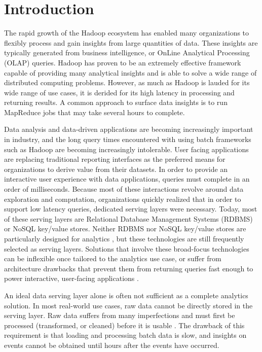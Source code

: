\documentclass{vldb}
\begin{document}
\section{Introduction}
The rapid growth of the Hadoop\cite{shvachko2010hadoop} ecosystem has enabled
many organizations to flexibly process and gain insights from large quantities
of data. These insights are typically generated from business intelligence, or
OnLine Analytical Processing (OLAP) queries. Hadoop has proven to be an
extremely effective framework capable of providing many analytical insights and
is able to solve a wide range of distributed computing problems. However, as
much as Hadoop is lauded for its wide range of use cases, it is derided for its
high latency in processing and returning results. A common approach to surface
data insights is to run MapReduce jobs that may take several hours to complete.

Data analysis and data-driven applications are becoming increasingly important
in industry, and the long query times encountered with using batch frameworks
such as Hadoop are becoming increasingly intolerable. User facing applications
are replacing traditional reporting interfaces as the preferred means for
organizations to derive value from their datasets. In order to provide an
interactive user experience with data applications, queries must complete in an
order of milliseconds. Because most of these interactions revolve around data
exploration and computation, organizations quickly realized that in order to 
support low latency queries, dedicated serving layers were necessary. Today,
most of these serving layers are Relational Database Management Systems (RDBMS)
or NoSQL key/value stores. Neither RDBMS nor NoSQL key/value stores are
particularly designed for analytics \cite{stonebraker2009requirements}, but
these technologies are still frequently selected as serving layers. Solutions
that involve these broad-focus technologies can be inflexible once tailored to
the analytics use case, or suffer from architecture drawbacks that prevent them
from returning queries fast enough to power interactive, user-facing
applications \cite{tschetter2011robux}.

An ideal data serving layer alone is often not sufficient as a complete analytics
solution. In most real-world use cases, raw data cannot be directly stored in
the serving layer. Raw data suffers from many imperfections and must first be
processed (transformed, or cleaned) before it is usable
\cite{stonebraker2010mapreduce}. The drawback of this requirement is that
loading and processing batch data is slow, and insights on events cannot be
obtained until hours after the events have occurred.
\end{document}
